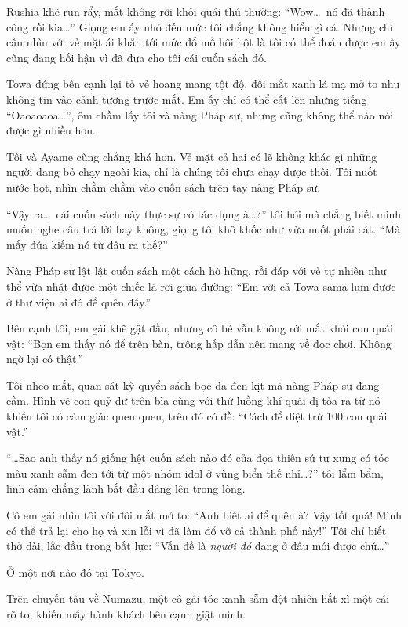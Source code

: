 \documentclass[../main.tex]{subfiles}
\begin{document}
Rushia khẽ run rẩy, mắt không rời khỏi quái thú thường: ``Wow\dots\ nó đã thành công rồi kìa\dots'' Giọng em ấy nhỏ đến mức tôi chẳng không hiểu gì cả. Nhưng chỉ cần nhìn với vẻ mặt ái khăn tới mức đổ mồ hôi hột là tôi có thể đoán được em ấy cũng đang hối hận vì đã đưa cho tôi cái cuốn sách đó.

Towa đứng bên cạnh lại tỏ vẻ hoang mang tột độ, đôi mắt xanh lá mạ mở to như không tin vào cảnh tượng trước mắt. Em ấy chỉ có thể cất lên những tiếng ``Oaoaoaoa\dots'', ôm chầm lấy tôi và nàng Pháp sư, nhưng cũng không thể nào nói được gì nhiều hơn.

Tôi và Ayame cũng chẳng khá hơn. Vẻ mặt cả hai có lẽ không khác gì những người đang bỏ chạy ngoài kia, chỉ là chúng tôi chưa chạy được thôi. Tôi nuốt nước bọt, nhìn chằm chằm vào cuốn sách trên tay nàng Pháp sư.

``Vậy ra\dots\ cái cuốn sách này thực sự có tác dụng à\dots?'' tôi hỏi mà chẳng biết mình muốn nghe câu trả lời hay không, giọng tôi khô khốc như vừa nuốt phải cát. ``Mà mấy đứa kiếm nó từ đâu ra thế?''

Nàng Pháp sư lật lật cuốn sách một cách hờ hững, rồi đáp với vẻ tự nhiên như thể vừa nhặt được một chiếc lá rơi giữa đường: ``Em với cả Towa-sama lụm được ở thư viện ai đó để quên đấy.''

Bên cạnh tôi, em gái khẽ gật đầu, nhưng cô bé vẫn không rời mắt khỏi con quái vật: ``Bọn em thấy nó để trên bàn, trông hấp dẫn nên mang về đọc chơi. Không ngờ lại có thật.''

Tôi nheo mắt, quan sát kỹ quyển sách bọc da đen kịt mà nàng Pháp sư đang cầm. Hình vẽ con quỷ dữ trên bìa cùng với thứ luồng khí quái dị tỏa ra từ nó khiến tôi có cảm giác quen quen, trên đó có đề: ``Cách để diệt trừ 100 con quái vật.''

``\dots  Sao anh thấy nó giống hệt cuốn sách nào đó của đọa thiên sứ tự xưng có tóc màu xanh sẫm đen tới từ một nhóm idol ở vùng biển thế nhỉ\dots?'' tôi lẩm bẩm, linh cảm chẳng lành bắt đầu dâng lên trong lòng.

Cô em gái nhìn tôi với đôi mắt mở to: ``Anh biết ai để quên à? Vậy tốt quá! Mình có thể trả lại cho họ và xin lỗi vì đã làm đổ vỡ cả thành phố này!'' Tôi chỉ biết thở dài, lắc đầu trong bất lực: ``Vấn đề là \emph{người đó} đang ở đâu mới được chứ\dots''

\begin{center}
  \uline{Ở một nơi nào đó tại Tokyo.}
  \pov{-}
\end{center}

Trên chuyến tàu về Numazu, một cô gái tóc xanh sẫm đột nhiên hắt xì một cái rõ to, khiến mấy hành khách bên cạnh giật mình.
\end{document}
